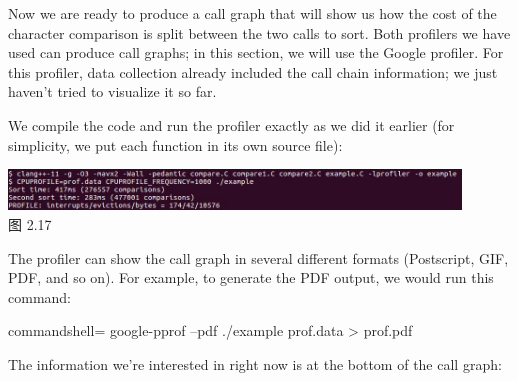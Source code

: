 Now we are ready to produce a call graph that will show us how the cost of the character comparison is split between the two calls to sort. Both profilers we have used can produce call graphs; in this section, we will use the Google profiler. For this profiler, data collection already included the call chain information; we just haven't tried to visualize it so far.

We compile the code and run the profiler exactly as we did it earlier (for simplicity, we put each function in its own source file):

\begin{center}
\includegraphics[width=0.9\textwidth]{content/1/chapter2/images/17.jpg}\\
图 2.17
\end{center}

The profiler can show the call graph in several different formats (Postscript, GIF, PDF, and so on). For example, to generate the PDF output, we would run this command:

\begin{tcblisting}{commandshell={}}
google-pprof --pdf ./example prof.data > prof.pdf
\end{tcblisting}

The information we're interested in right now is at the bottom of the call graph: 

